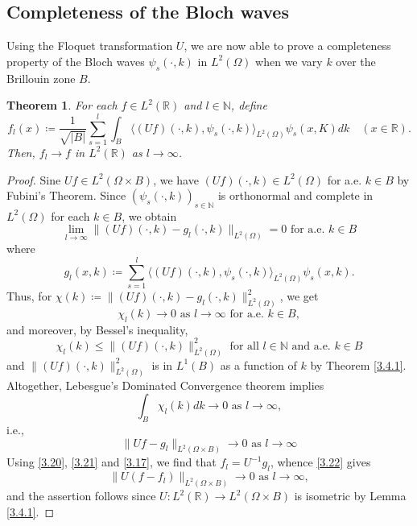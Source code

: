 \documentclass[fontsize=14pt,a4paper,DIV=1]{scrartcl}
\newtheorem{theorem}{Theorem}[section]
\numberwithin{equation}{section}
\newcommand{\R}{\mathbb{R}}
\newcommand{\N}{\mathbb{N}}
\begin{document}
\subsection{Completeness of the Bloch waves}
Using the Floquet transformation $U$, we are now able to prove a completeness property of the Bloch waves $\psi_{s}(\cdot, k)$ in $L^{2}(\Omega)$ when we vary $k$ over the Brillouin zone $B$.
	
	\begin{theorem}
		For each $f \in L^{2}(\R)$ and $l \in \N$, define
			\begin{equation}
				f_{l}(x) \coloneqq \frac{1}{\sqrt{|B|}} \sum_{s=1}^{l} \int_{B} \langle (Uf)(\cdot, k), \psi_{s}(\cdot, k) \rangle_{L^{2}(\Omega)} \psi_{s}(x, K) dk \quad (x \in \R). \label{3.20}
			\end{equation}
		Then, $f_{l} \rightarrow f$ in $L^{2}(\R)$ as $l \rightarrow \infty$.
	\end{theorem}
	\begin{proof}
		Sine $Uf \in L^{2}(\Omega \times B)$, we have $(Uf)(\cdot, k) \in L^{2}(\Omega)$ for a.e. $k \in B$ by Fubini's Theorem. Since $(\psi_{s}(\cdot, k))_{s \in \N}$ is orthonormal and complete in $L^{2}(\Omega)$ for each $k \in B$, we obtain
			\[ \lim_{l \rightarrow \infty} \| (Uf)(\cdot, k) - g_{l}(\cdot, k) \|_{L^{2}(\Omega)} = 0 \text{ for a.e. } k \in B\]
		where 
			\begin{equation}
				g_{l}(x, k) \coloneqq \sum_{s=1}^{l} \langle(Uf)(\cdot, k), \psi_{s}(\cdot,k)\rangle_{L^{2}(\Omega)} \psi_{s}(x,k). \label{3.21}
			\end{equation}
		Thus, for $\chi(k) \coloneqq \| (Uf)(\cdot, k) - g_{l}(\cdot, k) \|^{2}_{L^{2}(\Omega)}$, we get
			\[ \chi_{l}(k) \rightarrow 0 \text{ as } l \rightarrow \infty \text{ for a.e. } k \in B, \]
		and moreover, by Bessel's inequality,
			\[ \chi_{l}(k) \leq \| (Uf)(\cdot, k) \|^{2}_{L^{2}(\Omega)} \text{ for all } l \in \N \text{ and a.e. } k \in B \]
		and $\|(Uf)(\cdot, k)\|^{2}_{L^{2}(\Omega)}$ is in $L^{1}(B)$ as a function of $k$ by Theorem \ref{3.4.1}. Altogether, Lebesgue's Dominated Convergence theorem implies
			\[ \int_{B} \chi_{l}(k) dk \rightarrow 0 \text{ as } l \rightarrow \infty, \]
		i.e., 
			\begin{equation}
				\| U f - g_{l} \|_{L^{2}(\Omega \times B)} \rightarrow 0 \text{ as } l \rightarrow \infty \label{3.22}
			\end{equation} 
		Using \eqref{3.20}, \eqref{3.21} and \eqref{3.17}, we find that $f_{l} = U^{-1}g_{l}$, whence \eqref{3.22} gives
			\[ \| U(f - f_{l}) \|_{L^{2}(\Omega \times B)} \rightarrow 0 \text{ as } l \rightarrow \infty,\]
		and the assertion follows since $U \colon L^{2}(\R) \rightarrow L^{2}(\Omega \times B)$ is isometric by Lemma \eqref{3.4.1}.
	\end{proof}
	
\end{document}
